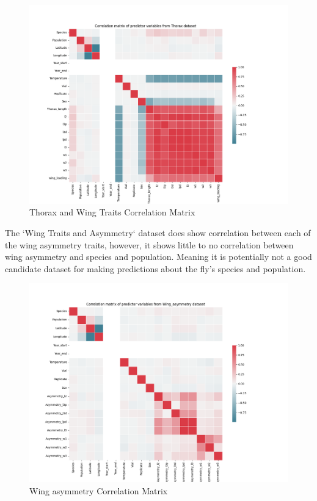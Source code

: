 \documentclass{article}
\begin{document}
\begin{figure}
    \centering
    \includegraphics{plots/Thorax_corr_matrix.png}
    \caption{Thorax and Wing Traits Correlation Matrix}
    \label{fig:thorax_wing_traits_corr_matrix}
\end{figure}

The `Wing Traits and Asymmetry` dataset does show correlation between each of the wing asymmetry traits, however, it shows little to no correlation between wing asymmetry and species and population. Meaning it is potentially not a good candidate dataset for making predictions about the fly's species and population.

\begin{figure}
    \centering
    \includegraphics{plots/Wing_asymmetry_corr_matrix.png}
    \caption{Wing asymmetry Correlation Matrix}
    \label{fig:wing_asymmetry_corr_matrix}
\end{figure}
\end{document}
